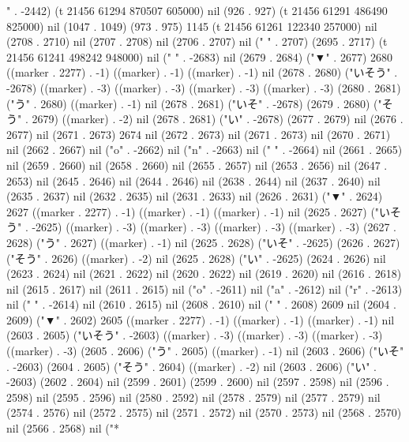 " . -2442) (t 21456 61294 870507 605000) nil (926 . 927) (t 21456 61291 486490 825000) nil (1047 . 1049) (973 . 975) 1145 (t 21456 61261 122340 257000) nil (2708 . 2710) nil (2707 . 2708) nil (2706 . 2707) nil (" " . 2707) (2695 . 2717) (t 21456 61241 498242 948000) nil (" " . -2683) nil (2679 . 2684) ("▼" . 2677) 2680 ((marker . 2277) . -1) ((marker) . -1) ((marker) . -1) nil (2678 . 2680) ("いそう" . -2678) ((marker) . -3) ((marker) . -3) ((marker) . -3) ((marker) . -3) (2680 . 2681) ("う" . 2680) ((marker) . -1) nil (2678 . 2681) ("いそ" . -2678) (2679 . 2680) ("そう" . 2679) ((marker) . -2) nil (2678 . 2681) ("い" . -2678) (2677 . 2679) nil (2676 . 2677) nil (2671 . 2673) 2674 nil (2672 . 2673) nil (2671 . 2673) nil (2670 . 2671) nil (2662 . 2667) nil ("o" . -2662) nil ("n" . -2663) nil (" " . -2664) nil (2661 . 2665) nil (2659 . 2660) nil (2658 . 2660) nil (2655 . 2657) nil (2653 . 2656) nil (2647 . 2653) nil (2645 . 2646) nil (2644 . 2646) nil (2638 . 2644) nil (2637 . 2640) nil (2635 . 2637) nil (2632 . 2635) nil (2631 . 2633) nil (2626 . 2631) ("▼" . 2624) 2627 ((marker . 2277) . -1) ((marker) . -1) ((marker) . -1) nil (2625 . 2627) ("いそう" . -2625) ((marker) . -3) ((marker) . -3) ((marker) . -3) ((marker) . -3) (2627 . 2628) ("う" . 2627) ((marker) . -1) nil (2625 . 2628) ("いそ" . -2625) (2626 . 2627) ("そう" . 2626) ((marker) . -2) nil (2625 . 2628) ("い" . -2625) (2624 . 2626) nil (2623 . 2624) nil (2621 . 2622) nil (2620 . 2622) nil (2619 . 2620) nil (2616 . 2618) nil (2615 . 2617) nil (2611 . 2615) nil ("o" . -2611) nil ("a" . -2612) nil ("r" . -2613) nil (" " . -2614) nil (2610 . 2615) nil (2608 . 2610) nil (" " . 2608) 2609 nil (2604 . 2609) ("▼" . 2602) 2605 ((marker . 2277) . -1) ((marker) . -1) ((marker) . -1) nil (2603 . 2605) ("いそう" . -2603) ((marker) . -3) ((marker) . -3) ((marker) . -3) ((marker) . -3) (2605 . 2606) ("う" . 2605) ((marker) . -1) nil (2603 . 2606) ("いそ" . -2603) (2604 . 2605) ("そう" . 2604) ((marker) . -2) nil (2603 . 2606) ("い" . -2603) (2602 . 2604) nil (2599 . 2601) (2599 . 2600) nil (2597 . 2598) nil (2596 . 2598) nil (2595 . 2596) nil (2580 . 2592) nil (2578 . 2579) nil (2577 . 2579) nil (2574 . 2576) nil (2572 . 2575) nil (2571 . 2572) nil (2570 . 2573) nil (2568 . 2570) nil (2566 . 2568) nil ("*
